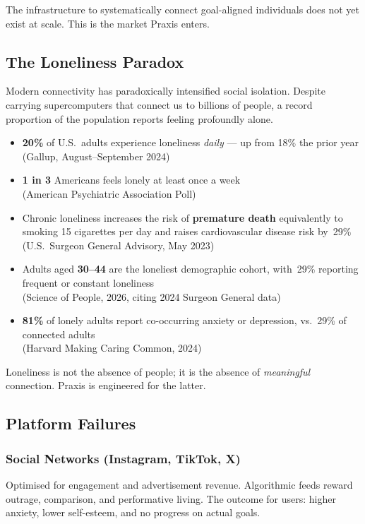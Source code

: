 \documentclass[11pt,a4paper]{article}
\begin{document}
The infrastructure to systematically connect goal-aligned individuals does not yet exist at scale. This is the market Praxis enters.

\subsection{The Loneliness Paradox}

Modern connectivity has paradoxically intensified social isolation. Despite carrying supercomputers that connect us to billions of people, a record proportion of the population reports feeling profoundly alone.

\begin{statbox}
\begin{itemize}[nosep]
  \item \textbf{20\%} of U.S.\ adults experience loneliness \textit{daily} — up from 18\% the prior year \\ {\small (Gallup, August–September 2024)}
  \item \textbf{1 in 3} Americans feels lonely at least once a week \\ {\small (American Psychiatric Association Poll)}
  \item Chronic loneliness increases the risk of \textbf{premature death} equivalently to smoking 15 cigarettes per day and raises cardiovascular disease risk by~29\% \\ {\small (U.S.\ Surgeon General Advisory, May 2023)}
  \item Adults aged \textbf{30–44} are the loneliest demographic cohort, with~29\% reporting frequent or constant loneliness \\ {\small (Science of People, 2026, citing 2024 Surgeon General data)}
  \item \textbf{81\%} of lonely adults report co-occurring anxiety or depression, vs.\ 29\% of connected adults \\ {\small (Harvard Making Caring Common, 2024)}
\end{itemize}
\end{statbox}

Loneliness is not the absence of people; it is the absence of \textit{meaningful} connection. Praxis is engineered for the latter.

\subsection{Platform Failures}

\subsubsection{Social Networks (Instagram, TikTok, X)}
Optimised for engagement and advertisement revenue. Algorithmic feeds reward outrage, comparison, and performative living. The outcome for users: higher anxiety, lower self-esteem, and no progress on actual goals.
\end{document}
